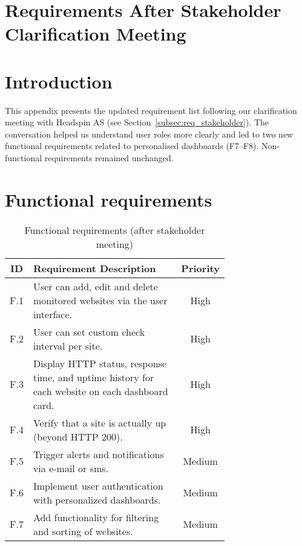 \section{Requirements After Stakeholder Clarification Meeting}
\label{app:req_from_stakeholder}

\section*{Introduction}

This appendix presents the updated requirement list following our clarification meeting with Headspin AS  (see Section~\ref{subsec:req_stakeholder}). The conversation helped us understand user roles more clearly and led to two new functional requirements related to personalised dashboards (F7–F8). Non-functional requirements remained unchanged.

\section*{Functional requirements}
\begin{table}[H]
\centering
\caption{Functional requirements (after stakeholder meeting)}
\label{tab:appF-functional}
\begin{tabular}{|c|p{0.72\linewidth}|c|}
\hline
\textbf{ID} & \textbf{Requirement Description} & \textbf{Priority} \\ \hline
F.1 & User can add, edit and delete monitored websites via the user interface.& High \\ \hline
F.2 & User can set custom check interval per site.& High \\ \hline
F.3 & Display HTTP status, response time, and uptime history for each website on each dashboard card.& High \\ \hline
F.4 & Verify that a site is actually up (beyond HTTP 200). & High \\ \hline 
 F.5& Trigger alerts and notifications via e-mail or sms.&Medium \\\hline\hline \hline
F.6& Implement user authentication with personalized dashboards.& Medium\\ \hline
F.7& Add functionality for filtering and sorting of websites.& Medium \\\hline
\end{tabular}
\end{table}

